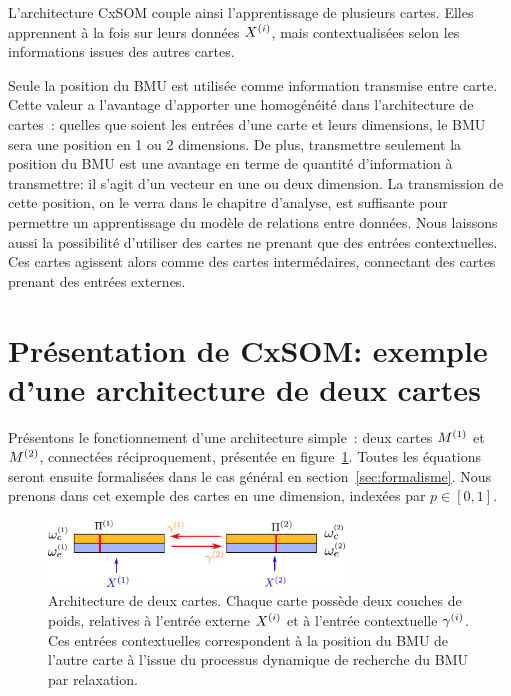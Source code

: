\documentclass[../main]{subfiles}
\begin{document}
L'architecture CxSOM couple ainsi l'apprentissage de plusieurs cartes. Elles apprennent à la fois sur leurs données $X^{({i})}$, mais contextualisées selon les informations issues des autres cartes.

Seule la position du BMU est utilisée comme information transmise entre carte. Cette valeur a l'avantage d'apporter une homogénéité dans l'architecture de cartes~: quelles que soient les entrées d'une carte et leurs dimensions, le BMU sera une position en 1 ou 2 dimensions. De plus, transmettre seulement la position du BMU est une avantage en terme de quantité d'information à transmettre: il s'agit d'un vecteur en une ou deux dimension.
La transmission de cette position, on le verra dans le chapitre d'analyse, est suffisante pour permettre un apprentissage du modèle de relations entre données.
Nous laissons aussi la possibilité d'utiliser des cartes ne prenant que des entrées contextuelles. Ces cartes agissent alors comme des cartes intermédaires, connectant des cartes prenant des entrées externes.


\section{Présentation de CxSOM: exemple d'une architecture de deux cartes}

Présentons le fonctionnement d'une architecture simple~: deux cartes $M^{({1})}$ et $M^{({2})}$, connectées réciproquement, présentée en figure~\ref{fig:2som_archi}. Toutes les équations seront ensuite formalisées dans le cas général en section~\ref{sec:formalisme}. 
Nous prenons dans cet exemple des cartes en une dimension, indexées par $p \in [0,1]$.
\begin{figure}[ht]
    \centering
    \includegraphics[width=0.7\textwidth]{archi_2som}
    \caption{Architecture de deux cartes. Chaque carte possède deux couches de poids, relatives à l'entrée externe $X^{({i})}$ et à l'entrée contextuelle $\gamma^{({i})}$.
    Ces entrées contextuelles correspondent à la position du BMU de l'autre carte à l'issue du processus dynamique de recherche du BMU par relaxation.
    \label{fig:2som_archi}}
    \end{figure}
\end{document}

